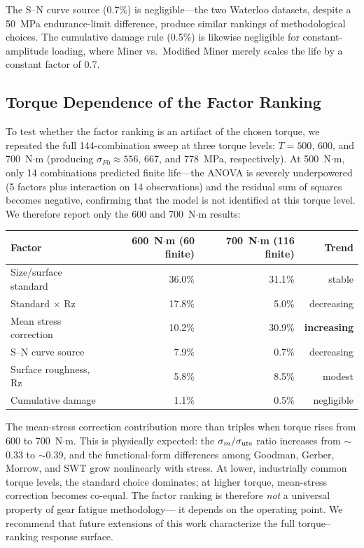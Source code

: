\documentclass[12pt,a4paper]{article}
\begin{document}
The S--N curve source (0.7\%) is negligible---the two Waterloo datasets,
despite a 50~MPa endurance-limit difference, produce similar rankings of
methodological choices. The cumulative damage rule (0.5\%) is likewise
negligible for constant-amplitude loading, where Miner vs.\ Modified
Miner merely scales the life by a constant factor of 0.7.

\subsection{Torque Dependence of the Factor Ranking}
\label{sec:torque}

To test whether the factor ranking is an artifact of the chosen torque,
we repeated the full 144-combination sweep at three torque levels:
$T = 500$, 600, and 700~N$\cdot$m (producing $\sigma_{F0} \approx 556$,
667, and 778~MPa, respectively). At 500~N$\cdot$m, only 14 combinations
predicted finite life---the ANOVA is severely underpowered (5 factors
plus interaction on 14 observations) and the residual sum of squares
becomes negative, confirming that the model is not identified at this
torque level. We therefore report only the 600 and 700~N$\cdot$m
results:

\vspace{4pt}
\noindent\begin{tabular}{lrrr}
\toprule
Factor & 600~N$\cdot$m (60 finite) & 700~N$\cdot$m (116 finite) & Trend \\
\midrule
Size/surface standard & 36.0\% & 31.1\% & stable \\
Standard $\times$ Rz & 17.8\% & 5.0\% & decreasing \\
Mean stress correction & 10.2\% & 30.9\% & \textbf{increasing} \\
S--N curve source & 7.9\% & 0.7\% & decreasing \\
Surface roughness, Rz & 5.8\% & 8.5\% & modest \\
Cumulative damage & 1.1\% & 0.5\% & negligible \\
\bottomrule
\end{tabular}
\vspace{4pt}

The mean-stress correction contribution more than triples when torque
rises from 600 to 700~N$\cdot$m. This is physically expected: the
$\sigma_m/\sigma_{\rm uts}$ ratio increases from $\sim$0.33 to
$\sim$0.39, and the functional-form differences among Goodman, Gerber,
Morrow, and SWT grow nonlinearly with stress. At lower, industrially
common torque levels, the standard choice dominates; at higher torque,
mean-stress correction becomes co-equal. The factor ranking is
therefore \emph{not} a universal property of gear fatigue methodology---
it depends on the operating point. We recommend that future extensions
of this work characterize the full torque--ranking response surface.
\end{document}
